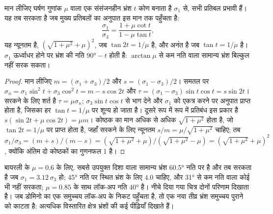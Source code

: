 \begin{proposition}[सामान्य भ्रंश का घर्षणी लॉक-अप]\label{prop:b3:extension-strike-slip:lockup}
मान लीजिए घर्षण गुणांक $\mu$ वाला एक संसंजनहीन भ्रंश
$t$ कोण बनाता है $\sigma_1$ से, सभी प्रतिबल प्रभावी हैं। यह तब सरकता है जब
मुख्य प्रतिबलों का अनुपात इस मान तक पहुँचता है:
\[
  \frac{\sigma_1}{\sigma_3} = \frac{1 + \mu\cot t}{1 - \mu\tan t} ,
\]
यह न्यूनतम है, $(\sqrt{1 + \mu^2} + \mu)^2$, जब $\tan2t = 1/\mu$ है, और
अनंत है जब $\tan t = 1/\mu$ है। $\sigma_1$ ऊर्ध्वाधर होने पर भ्रंश की नति
$\ang{90} - t$ होती है: $\arctan\mu$ से कम नति वाला सामान्य भ्रंश
बिल्कुल नहीं सरक सकता।
\end{proposition}

\begin{proof}
मान लीजिए $m = (\sigma_1 + \sigma_3)/2$ और $s = (\sigma_1 - \sigma_3)/2$। समतल पर
$\sigma_n = \sigma_1\sin^2t + \sigma_3\cos^2t = m - s\cos2t$ और
$\tau = (\sigma_1 - \sigma_3)\sin t\cos t = s\sin2t$। सरकने के लिए शर्त है $\tau =
\mu\sigma_n$; $\sigma_3\sin t\cos t$ से भाग देने और $\sigma_1$ को एकत्र करने पर
अनुपात प्राप्त होता है, जिसका हर $\tan t = 1/\mu$ पर शून्य हो जाता है। दूसरे रूप में
रूप में प्रतिबंध इस प्रकार है $s(\sin2t + \mu\cos2t) = \mu m$। कोष्ठक का मान
अधिक से अधिक $\sqrt{1 + \mu^2}$ होता है, जो $\tan2t = 1/\mu$ पर प्राप्त होता है, जहाँ सरकने के लिए
न्यूनतम $s/m = \mu/\sqrt{1 + \mu^2}$ चाहिए; तब $\sigma_1/\sigma_3 = (m + s)/(m - s) =
(\sqrt{1 + \mu^2} + \mu)/(\sqrt{1 + \mu^2} - \mu) = (\sqrt{1 + \mu^2} +
\mu)^2$, क्योंकि अंतिम दो कोष्ठकों का गुणनफल 1 है।
\end{proof}

बायरली के $\mu = 0.6$ के लिए, सबसे उपयुक्त दिशा वाला सामान्य भ्रंश \ang{60.5} नति पर है और
तब सरकता है जब $\sigma_1 = 3.12\,\sigma_3$ हो; \ang{45} नति पर स्थित भ्रंश के लिए $4.0$ चाहिए, और
\ang{31} से कम नति वाला कोई भी नहीं सरकता; $\mu = 0.85$ के साथ लॉक-अप नति
\ang{40} है। नीचे दिया गया चित्र दोनों परिणाम दिखाता है। जब डोमिनो का एक समुच्चय
लॉक-अप के निकट पहुँचता है, तो एक नया तीव्र भ्रंश समुच्चय पुराने को काटता है: अत्यधिक विस्तारित क्षेत्र
भ्रंशों की कई पीढ़ियाँ दिखाते हैं।

